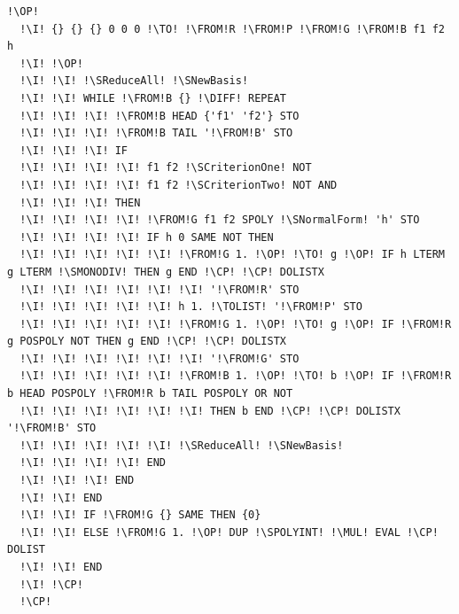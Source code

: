 \documentclass[12pt,a4paper]{report}
\newcommand{\kwd}[1]{\texttt{\textcolor{keyword}{#1}}}
\newcommand{\I}{\enspace\textcolor{indent}\vrule\hspace{2pt}}
\newcommand{\DIFF}{\kwd{$\neq$}} %
\newcommand{\MUL}{\kwd{*}}   %
\newcommand{\TOLIST}{\kwd{$\rightarrow$LIST}} %
\newcommand{\SMONODIV}{\kwd{\$MONODIV}}   %
\newcommand{\SPOLYINT}{\kwd{\$POLYINT}}   %
\newcommand{\SReduceAll}{\kwd{\$ReduceAll}}   %
\newcommand{\SNewBasis}{\kwd{\$NewBasis}}   %
\newcommand{\SNormalForm}{\kwd{\$NormalForm}}   %
\newcommand{\SCriterionOne}{\kwd{\$Criterion1}}   %
\newcommand{\SCriterionTwo}{\kwd{\$Criterion2}}   %
\newcommand{\OP}{\kwd{$\ll$}}   %
\newcommand{\CP}{\kwd{$\gg$}}   %
\newcommand{\TO}{\kwd{$\rightarrow$}} %
\newcommand{\FROM}{\kwd{$\leftarrow$}} %
\numberwithin{theorem}{chapter}
\begin{document}
\begin{lstlisting}[language=userrpl]
  !\OP!
  !\I! {} {} {} 0 0 0 !\TO! !\FROM!R !\FROM!P !\FROM!G !\FROM!B f1 f2 h
  !\I! !\OP!
  !\I! !\I! !\SReduceAll! !\SNewBasis!
  !\I! !\I! WHILE !\FROM!B {} !\DIFF! REPEAT
  !\I! !\I! !\I! !\FROM!B HEAD {'f1' 'f2'} STO
  !\I! !\I! !\I! !\FROM!B TAIL '!\FROM!B' STO
  !\I! !\I! !\I! IF
  !\I! !\I! !\I! !\I! f1 f2 !\SCriterionOne! NOT
  !\I! !\I! !\I! !\I! f1 f2 !\SCriterionTwo! NOT AND
  !\I! !\I! !\I! THEN
  !\I! !\I! !\I! !\I! !\FROM!G f1 f2 SPOLY !\SNormalForm! 'h' STO
  !\I! !\I! !\I! !\I! IF h 0 SAME NOT THEN
  !\I! !\I! !\I! !\I! !\I! !\FROM!G 1. !\OP! !\TO! g !\OP! IF h LTERM g LTERM !\SMONODIV! THEN g END !\CP! !\CP! DOLISTX
  !\I! !\I! !\I! !\I! !\I! !\I! '!\FROM!R' STO
  !\I! !\I! !\I! !\I! !\I! h 1. !\TOLIST! '!\FROM!P' STO
  !\I! !\I! !\I! !\I! !\I! !\FROM!G 1. !\OP! !\TO! g !\OP! IF !\FROM!R g POSPOLY NOT THEN g END !\CP! !\CP! DOLISTX
  !\I! !\I! !\I! !\I! !\I! !\I! '!\FROM!G' STO
  !\I! !\I! !\I! !\I! !\I! !\FROM!B 1. !\OP! !\TO! b !\OP! IF !\FROM!R b HEAD POSPOLY !\FROM!R b TAIL POSPOLY OR NOT
  !\I! !\I! !\I! !\I! !\I! !\I! THEN b END !\CP! !\CP! DOLISTX '!\FROM!B' STO
  !\I! !\I! !\I! !\I! !\I! !\SReduceAll! !\SNewBasis!
  !\I! !\I! !\I! !\I! END
  !\I! !\I! !\I! END
  !\I! !\I! END
  !\I! !\I! IF !\FROM!G {} SAME THEN {0}
  !\I! !\I! ELSE !\FROM!G 1. !\OP! DUP !\SPOLYINT! !\MUL! EVAL !\CP! DOLIST
  !\I! !\I! END
  !\I! !\CP!
  !\CP!
\end{lstlisting}
\end{document}

